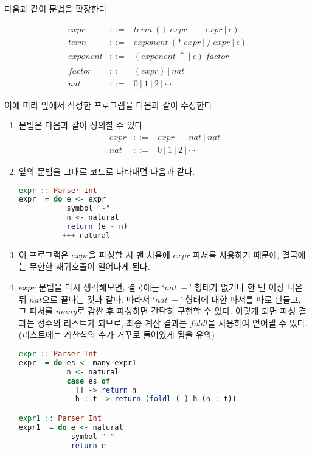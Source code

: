 
다음과 같이 문법을 확장한다.

\[\begin{array}{lcl}
  expr     & ::= & term~(+~expr~|~-~expr~|~\epsilon) \\
  term     & ::= & exponent~(*~expr~|~/~expr~|~\epsilon) \\
  exponent & ::= & (exponent~\uparrow~|~\epsilon)~factor \\
  factor   & ::= & (expr) ~|~ nat \\
  nat      & ::= & 0 ~|~ 1 ~|~ 2 ~|~ \cdots
\end{array}\]

이에 따라 앞에서 작성한 프로그램을 다음과 같이 수정한다.

\renewcommand{\theenumi}{\alph{enumi}}
\renewcommand{\labelenumi}{(\theenumi)}
\begin{enumerate}
\item 문법은 다음과 같이 정의할 수 있다.
  \[\begin{array}{lcl}
    expr     & ::= & expr~-~nat ~|~ nat \\
    nat      & ::= & 0 ~|~ 1 ~|~ 2 ~|~ \cdots
  \end{array}\]
\item 앞의 문법을 그대로 코드로 나타내면 다음과 같다.
  \begin{lstlisting}[language=Haskell]
expr :: Parser Int
expr  = do e <- expr
           symbol "-"
           n <- natural
           return (e - n)
          +++ natural
  \end{lstlisting}
\item 이 프로그램은 $expr$을 파싱할 시 맨 처음에 $expr$ 파서를 사용하기
  때문에, 결국에는 무한한 재귀호출이 일어나게 된다.
\item $expr$ 문법을 다시 생각해보면, 결국에는 `$nat~-$' 형태가 없거나 한 번 이상
  나온 뒤 $nat$으로 끝나는 것과 같다. 따라서 `$nat~-$' 형태에 대한 파서를 따로
  만들고, 그 파서를 $many$로 감싼 후 파싱하면 간단히 구현할 수 있다. 이렇게
  되면 파싱 결과는 정수의 리스트가 되므로, 최종 계산 결과는 $foldl$을 사용하여
  얻어낼 수 있다. (리스트에는 계산식의 수가 거꾸로 들어있게 됨을 유의)
  \begin{lstlisting}[language=Haskell]
expr :: Parser Int
expr  = do es <- many expr1
           n <- natural
           case es of
             [] -> return n
             h : t -> return (foldl (-) h (n : t))

expr1 :: Parser Int
expr1  = do e <- natural
            symbol "-"
            return e
  \end{lstlisting}
\end{enumerate}


